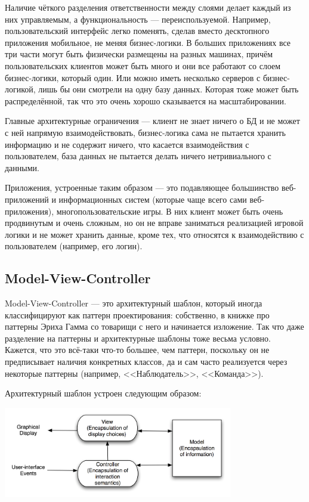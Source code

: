 \documentclass{../../text-style}
\begin{document}
Наличие чёткого разделения ответственности между слоями делает каждый из них управляемым, а функциональность --- переиспользуемой. Например, пользовательский интерфейс легко поменять, сделав вместо десктопного приложения мобильное, не меняя бизнес-логики. В больших приложениях все три части могут быть физически размещены на разных машинах, причём пользовательских клиентов может быть много и они все работают со слоем бизнес-логики, который один. Или можно иметь несколько серверов с бизнес-логикой, лишь бы они смотрели на одну базу данных. Которая тоже может быть распределённой, так что это очень хорошо сказывается на масштабировании. 

Главные архитектурные ограничения --- клиент не знает ничего о БД и не может с ней напрямую взаимодействовать, бизнес-логика сама не пытается хранить информацию и не содержит ничего, что касается взаимодействия с пользователем, база данных не пытается делать ничего нетривиального с данными. 

Приложения, устроенные таким образом --- это подавляющее большинство веб-приложений и информационных систем (которые чаще всего сами веб-приложения), многопользовательские игры. В них клиент может быть очень продвинутым и очень сложным, но он не вправе заниматься реализацией игровой логики и не может хранить данные, кроме тех, что относятся к взаимодействию с пользователем (например, его логин).

\subsection{Model-View-Controller}

Model-View-Controller --- это архитектурный шаблон, который иногда классифицируют как паттерн проектирования: собственно, в книжке про паттерны Эриха Гамма со товарищи с него и начинается изложение. Так что даже разделение на паттерны и архитектурные шаблоны тоже весьма условно. Кажется, что это всё-таки что-то большее, чем паттерн, поскольку он не предписывает наличия конкретных классов, да и сам часто реализуется через некоторые паттерны (например, <<Наблюдатель>>, <<Команда>>).

Архитектурный шаблон устроен следующим образом:

\begin{center}
    \includegraphics[width=0.75\textwidth]{mvc.png}
\end{center}
\end{document}
